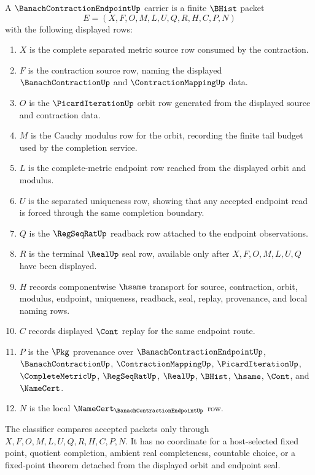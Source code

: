 \begin{definition}
\label{def:banach-contraction-endpoint-carrier}
A $\BanachContractionEndpointUp$ carrier is a finite $\BHist$ packet
$$
E=(X,F,O,M,L,U,Q,R,H,C,P,N)
$$
with the following displayed rows:
\begin{enumerate}
\item $X$ is the complete separated metric source row consumed by the contraction.
\item $F$ is the contraction source row, naming the displayed $\BanachContractionUp$ and $\ContractionMappingUp$ data.
\item $O$ is the $\PicardIterationUp$ orbit row generated from the displayed source and contraction data.
\item $M$ is the Cauchy modulus row for the orbit, recording the finite tail budget used by the completion service.
\item $L$ is the complete-metric endpoint row reached from the displayed orbit and modulus.
\item $U$ is the separated uniqueness row, showing that any accepted endpoint read is forced through the same completion boundary.
\item $Q$ is the $\RegSeqRatUp$ readback row attached to the endpoint observations.
\item $R$ is the terminal $\RealUp$ seal row, available only after $X,F,O,M,L,U,Q$ have been displayed.
\item $H$ records componentwise $\hsame$ transport for source, contraction, orbit, modulus, endpoint, uniqueness, readback, seal, replay, provenance, and local naming rows.
\item $C$ records displayed $\Cont$ replay for the same endpoint route.
\item $P$ is the $\Pkg$ provenance over $\BanachContractionEndpointUp$, $\BanachContractionUp$, $\ContractionMappingUp$, $\PicardIterationUp$, $\CompleteMetricUp$, $\RegSeqRatUp$, $\RealUp$, $\BHist$, $\hsame$, $\Cont$, and $\NameCert$.
\item $N$ is the local $\NameCert_{\BanachContractionEndpointUp}$ row.
\end{enumerate}
The classifier compares accepted packets only through $X,F,O,M,L,U,Q,R,H,C,P,N$. It has no coordinate for a host-selected fixed point, quotient completion, ambient real completeness, countable choice, or a fixed-point theorem detached from the displayed orbit and endpoint seal.
\end{definition}


